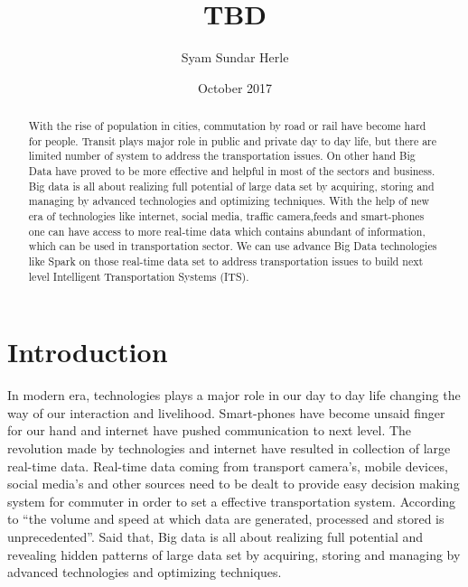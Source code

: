 \documentclass[sigconf]{acmart}
\begin{document}
\title{TBD}
 
 \author{Syam Sundar Herle}
 
 
 
 
 \date{October 2017}



\begin{abstract}

With the rise of population in cities, commutation by road or rail have become hard for people. Transit plays major role in public and private day to day life, but there are limited number of system to address the transportation issues. On other hand Big Data have proved to be more effective and helpful in most of the sectors and business. Big data is all about realizing full potential of large data set by acquiring, storing and managing by advanced technologies and optimizing techniques. With the help of new era of technologies like internet, social media, traffic camera,feeds and smart-phones one can have access to more real-time data which contains abundant of information, which can be used in transportation sector. We can use advance Big Data technologies like Spark on those real-time data set to address transportation issues to build next level Intelligent Transportation Systems (ITS). 

\end{abstract}


\maketitle

\section{Introduction}

In modern era, technologies plays a major role in our day to day life changing the way of our interaction and livelihood. Smart-phones have become unsaid finger for our hand and internet have pushed communication to next level. The revolution made by technologies and internet have resulted in collection of large real-time data. Real-time data coming from transport camera's, mobile devices, social media's and other sources need to be dealt to provide easy decision making system for commuter in order to set a effective transportation system. According to \cite{} ``the volume and speed at which data are generated, processed and stored is unprecedented''. Said that, Big data is all about realizing full potential and revealing hidden patterns of large data set by acquiring, storing and managing by advanced technologies and optimizing techniques. 
\end{document}
